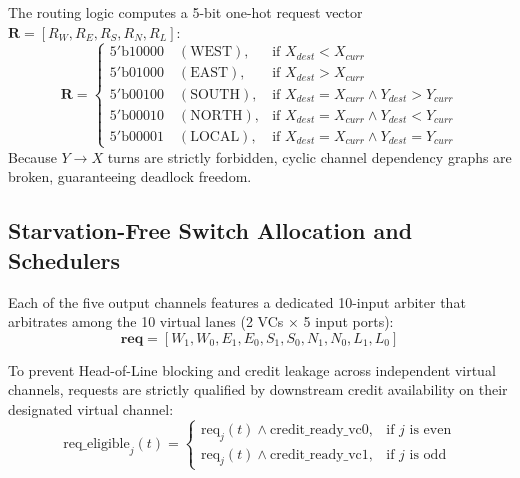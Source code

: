 \documentclass[conference]{IEEEtran}
\begin{document}
The routing logic computes a 5-bit one-hot request vector $\mathbf{R} = [R_W, R_E, R_S, R_N, R_L]$:
\begin{equation}
    \mathbf{R} = \begin{cases}
        5'\text{b}10000 \quad (\text{WEST}),  & \text{if } X_{dest} < X_{curr} \\
        5'\text{b}01000 \quad (\text{EAST}),  & \text{if } X_{dest} > X_{curr} \\
        5'\text{b}00100 \quad (\text{SOUTH}), & \text{if } X_{dest} = X_{curr} \land Y_{dest} > Y_{curr} \\
        5'\text{b}00010 \quad (\text{NORTH}), & \text{if } X_{dest} = X_{curr} \land Y_{dest} < Y_{curr} \\
        5'\text{b}00001 \quad (\text{LOCAL}), & \text{if } X_{dest} = X_{curr} \land Y_{dest} = Y_{curr}
    \end{cases}
\end{equation}
Because $Y \to X$ turns are strictly forbidden, cyclic channel dependency graphs are broken, guaranteeing deadlock freedom.

\subsection{Starvation-Free Switch Allocation and Schedulers}
Each of the five output channels features a dedicated 10-input arbiter that arbitrates among the 10 virtual lanes (2 VCs $\times$ 5 input ports):
\begin{equation}
    \mathbf{req} = [W_1, W_0, E_1, E_0, S_1, S_0, N_1, N_0, L_1, L_0]
\end{equation}

To prevent Head-of-Line blocking and credit leakage across independent virtual channels, requests are strictly qualified by downstream credit availability on their designated virtual channel:
\begin{equation}
    \text{req\_eligible}_j(t) = \begin{cases}
        \text{req}_j(t) \land \text{credit\_ready\_vc0}, & \text{if } j \text{ is even} \\
        \text{req}_j(t) \land \text{credit\_ready\_vc1}, & \text{if } j \text{ is odd}
    \end{cases}
\end{equation}
\end{document}
